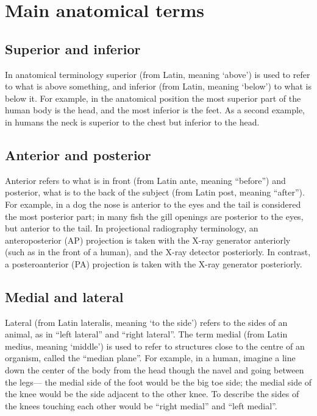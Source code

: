 \documentclass[]{book}
\begin{document}
\hypertarget{main-anatomical-terms}{%
\section{Main anatomical terms}\label{main-anatomical-terms}}

\hypertarget{superior-and-inferior}{%
\subsection{Superior and inferior}\label{superior-and-inferior}}

In anatomical terminology superior (from Latin, meaning `above') is used to refer to what is above something, and inferior (from Latin, meaning `below') to what is below it. For example, in the anatomical position the most superior part of the human body is the head, and the most inferior is the feet. As a second example, in humans the neck is superior to the chest but inferior to the head.

\hypertarget{anterior-and-posterior}{%
\subsection{Anterior and posterior}\label{anterior-and-posterior}}

Anterior refers to what is in front (from Latin ante, meaning ``before'') and posterior, what is to the back of the subject (from Latin post, meaning ``after''). For example, in a dog the nose is anterior to the eyes and the tail is considered the most posterior part; in many fish the gill openings are posterior to the eyes, but anterior to the tail. In projectional radiography terminology, an anteroposterior (AP) projection is taken with the X-ray generator anteriorly (such as in the front of a human), and the X-ray detector posteriorly. In contrast, a posteroanterior (PA) projection is taken with the X-ray generator posteriorly.

\hypertarget{medial-and-lateral}{%
\subsection{Medial and lateral}\label{medial-and-lateral}}

Lateral (from Latin lateralis, meaning `to the side') refers to the sides of an animal, as in ``left lateral'' and ``right lateral''. The term medial (from Latin medius, meaning `middle') is used to refer to structures close to the centre of an organism, called the ``median plane''. For example, in a human, imagine a line down the center of the body from the head though the navel and going between the legs--- the medial side of the foot would be the big toe side; the medial side of the knee would be the side adjacent to the other knee. To describe the sides of the knees touching each other would be ``right medial'' and ``left medial''.
\end{document}
